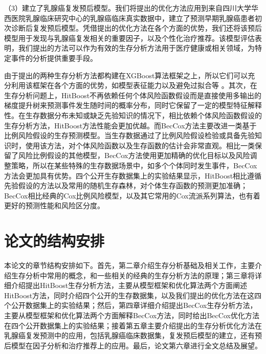 （3）建立了乳腺癌复发预后模型。我们将提出的优化方法应用到来自四川大学华西医院乳腺临床研究中心的乳腺癌临床真实数据中，建立了预测早期乳腺癌患者初次诊断后复发预后模型。凭借提出的优化方法在各个方面的优势，我们还将该预后模型用于发现与乳腺癌复发相关的重要因子，以及个性化治疗推荐。该模型评估表明，我们提出的方法可以作为有效的生存分析方法用于医疗健康或相关领域，为特定事件的分析提供重要手段。

由于提出的两种生存分析方法都构建在XGBoost算法框架之上，所以它们可以充分利用该框架在各个方面的优势，如模型表征能力以及避免过拟合等 。其次，在生存分析问题上，HitBoost不再依赖任何个体风险函数假设而是直接使用多输出的梯度提升树来预测事件发生随时间的概率分布，同时它保留了一定的模型特征解释性。在生存数据分布未知或缺乏先验知识的情况下，相比依赖个体风险函数假设的生存分析方法，HitBoost方法性能会更加优越。而BecCox方法主要改进一类基于比例风险假设的生存预测模型。当生存数据通过了比例风险假设检验或具备先验知识时，使用该方法，对个体风险函数以及生存函数的估计会非常直观。相比一类保留了风险比例假设的其他模型，BecCox方法使用更加精确的优化目标以及风险调整策略，所以在某些特殊的生存数据场景中，如多个个体同时发生事件，BecCox方法会更加具有优势。四个公开生存数据集上的实验结果显示，HitBoost相比遵循先验假设的方法以及常用的随机生存森林，对个体生存函数的预测更加准确；BecCox相比经典的Cox比例风险模型，以及其它常用的Cox流派系列算法，也有着更好的预测性能和风险区分度。

\section{论文的结构安排}

本论文的章节结构安排如下。首先，第二章介绍生存分析基础及相关工作，主要介绍生存分析中常用的概念，和一些相关的经典的生存分析方法的原理；第三章将详细介绍提出HitBoost生存分析方法，主要从模型框架和优化算法两个方面阐述HitBoost方法，同时介绍四个公开的生存数据集，以及我们提出的优化方法在这四个公开数据集上的实验结果；然后，第四章详细介绍提出BecCox生存分析方法，主要从模型框架和优化算法两个方面解释BecCox方法，同时给出BecCox优化方法在四个公开数据集上的实验结果；接着第五章主要介绍提出的生存分析优化方法在乳腺癌复发预测中的应用，包括乳腺癌临床数据集，复发预后模型的建立，还有预后模型在因子分析和治疗推荐上的应用。最后，论文第六章进行全文总结及展望。
